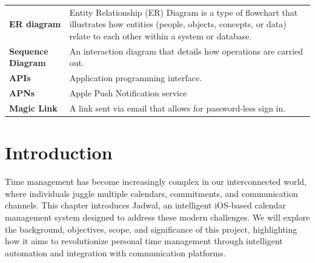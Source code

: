 \documentclass[12pt,a4paper]{report}
\begin{document}
\begin{singlespace}
\begin{center}
\begin{longtable}{p{}p{}}
            \textbf{ER diagram}       & Entity Relationship (ER) Diagram is a type of flowchart that illustrates how entities (people, objects, concepts, or data) relate to each other within a system or database. \\[1ex]

            \textbf{Sequence Diagram} & An interaction diagram that details how operations are carried out.                                                                                                          \\[1ex]

            \textbf{APIs}             & Application programming interface.                                                                                                                                           \\[1ex]

            \textbf{APNs}             & Apple Push Notification service                                                                                                                                              \\

            \textbf{Magic Link}       & A link sent via email that allows for password-less sign in.                                                                                                                 \\

            \bottomrule
        \end{longtable}
    \end{center}

\end{singlespace}


\chapter{Introduction}

Time management has become increasingly complex in our interconnected world, where individuals juggle multiple calendars, commitments, and communication channels. This chapter introduces Jadwal, an intelligent iOS-based calendar management system designed to address these modern challenges. We will explore the background, objectives, scope, and significance of this project, highlighting how it aims to revolutionize personal time management through intelligent automation and integration with communication platforms.
\end{document}
